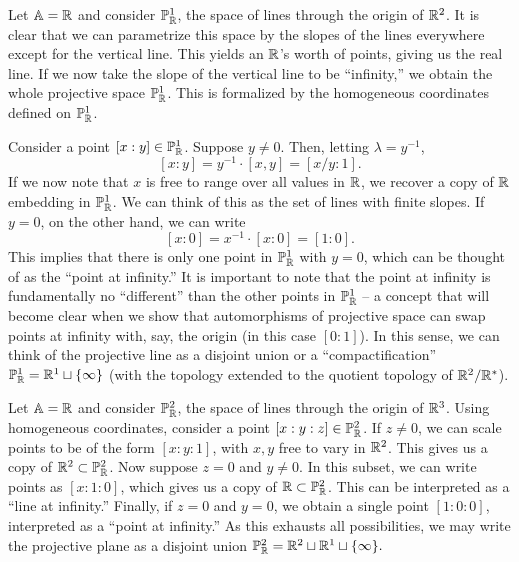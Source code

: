 \documentclass{../../mathnotes}
\begin{document}
\begin{exmp}
    Let $\mathbb{A}=\mathbb{R}$ and consider $\mathbb{P}^1_{\mathbb{R}}$, the space of lines through the origin of $\mathbb{R}^2$. It is clear that we can
    parametrize this space by the slopes of the lines everywhere except for the vertical line. This yields an $\mathbb{R}$'s worth
    of points, giving us the real line. If we now take the slope of the vertical line to be ``infinity,'' we obtain
    the whole projective space $\mathbb{P}^1_{\mathbb{R}}$. This is formalized by the homogeneous coordinates defined on $\mathbb{P}^1_{\mathbb{R}}$.

    Consider a point $[x:y]\in\mathbb{P}^1_{\mathbb{R}}$. Suppose $y\neq0$. Then, letting $\lambda=y^{-1}$,
    \[ [x:y]=y^{-1}\cdot[x,y]=[x/y:1]. \]
    If we now note that $x$ is free to range over all values in $\mathbb{R}$, we recover a copy of $\mathbb{R}$ embedding in $\mathbb{P}_{\mathbb{R}}^1$.
    We can think of this as the set of lines with finite slopes. If $y=0$, on the other hand, we can write
    \[ [x:0]=x^{-1}\cdot [x:0]=[1:0]. \]
    This implies that there is only one point in $\mathbb{P}^1_{\mathbb{R}}$ with $y=0$, which can be thought of as the ``point
    at infinity.'' It is important to note that the point at infinity is fundamentally no ``different'' than the other points
    in $\mathbb{P}_{\mathbb{R}}^1$ -- a concept that will become clear when we show that automorphisms of projective space can swap points
    at infinity with, say, the origin (in this case $[0:1]$). In this sense, we can think of the projective line as a disjoint union 
    or a ``compactification''
    $\mathbb{P}^1_{\mathbb{R}}=\mathbb{R}^1\sqcup\{\infty\}$
    (with the topology extended to the quotient topology of $\mathbb{R}^2/\mathbb{R}^*$).
\end{exmp}

\begin{exmp}
    Let $\mathbb{A}=\mathbb{R}$ and consider $\mathbb{P}^2_{\mathbb{R}}$, the space of lines through the origin of $\mathbb{R}^3$. Using homogeneous coordinates,
    consider a point $[x:y:z]\in\mathbb{P}^2_{\mathbb{R}}$. If $z\neq 0$, we can scale points to be of the form $[x:y:1]$, with $x,y$ free
    to vary in $\mathbb{R}^2$. This gives us a copy of $\mathbb{R}^2\subset\mathbb{P}^2_{\mathbb{R}}$. Now suppose $z=0$ and $y\neq 0$. In this
    subset, we can write points as $[x:1:0]$, which gives us a copy of $\mathbb{R}\subset\mathbb{P}^2_{\mathbb{R}}$. This can be interpreted as
    a ``line at infinity.'' Finally, if $z=0$ and $y=0$, we obtain a single point $[1:0:0]$, interpreted as a ``point at
    infinity.'' As this exhausts all possibilities, we may write the projective plane as a disjoint union $\mathbb{P}^2_{\mathbb{R}}=\mathbb{R}^2\sqcup\mathbb{R}^1\sqcup\{\infty\}.$ 
\end{exmp}
\end{document}
